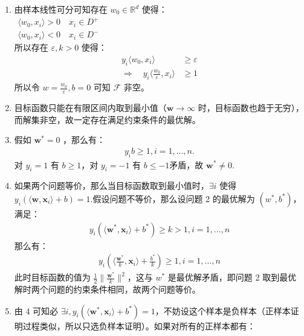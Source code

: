 \documentclass[11pt,letter,notitlepage]{article}
\begin{document}
\begin{solution}
	\heiti
	\begin{enumerate}
		\ \\
		\item
			由样本线性可分可知存在 $w_{0} \in \mathbb{R}^d$ 使得：\\
			$\begin{aligned} {\langle w_{0}, x_{i}\rangle > 0 \quad x_{i} \in D^{+}}  \\ {\langle w_{0}, x_{i}\rangle < 0   \quad x_{i} \in D^{-}} \end{aligned}$\\
			所以存在 $\varepsilon, k > 0$ 使得：
			\begin{align*}
				y_{i} \langle w_{0}, x_{i}\rangle &\geqslant \varepsilon \\  \Rightarrow \quad y_{i}\langle \frac{w_{0}}{\varepsilon}, x_{i}\rangle &\geqslant 1
			\end{align*}
			所以令 $w = \frac{w_{0}}{\varepsilon}, b = 0$ 可知 $\mathcal{F}$ 非空。
		\item 
			目标函数只能在有限区间内取到最小值（$\mathbf{w} \rightarrow \infty$ 时，目标函数也趋于无穷），而解集非空，故一定存在满足约束条件的最优解。
		\item
			假如 $\mathbf{w}^* = 0$ ，那么有：
			\begin{align*}
				y_i b \geqslant 1, i = 1,\ldots,n.
			\end{align*}
			对 $ y_i = 1$ 有 $b \geqslant 1$，对 $y_i = -1$ 有 $b \leqslant -1$矛盾，故 $\mathbf{w}^* \neq 0$.
		\item 如果两个问题等价，那么当目标函数取到最小值时，$\exists i$ 使得 $y_{i} ( \langle \textbf{w}, \textbf{x}_i \rangle + b ) = 1$.假设问题不等价，那么设问题 2 的最优解为 $(w^*, b^*)$，满足：
		\begin{align*}
			y_{i} ( \langle \textbf{w}^{*}, \textbf{x}_i \rangle + b^{*} ) \geqslant k > 1, i = 1,\ldots,n
		\end{align*}
		那么有：
		\begin{align*}
			y_{i} ( \langle \frac{\textbf{w}^{*}}{k}, \textbf{x}_i \rangle + \frac{b^*}{k} ) \geqslant 1, i = 1,\ldots,n
		\end{align*}
		此时目标函数的值为 $\frac{1}{2}\|\frac{\mathbf{w}^{*}}{k}\|^{2}$，这与 $w^*$ 是最优解矛盾，即问题 2 取到最优解时两个问题的约束条件相同，故两个问题等价。
		\item 由 4 可知必 $\exists i, y_{i} ( \langle \textbf{w}^{*}, \textbf{x}_i \rangle + b^{*} ) = 1$，不妨设这个样本是负样本（正样本证明过程类似，所以只选负样本证明）。如果对所有的正样本都有：

\end{enumerate}
\end{solution}
\end{document}
